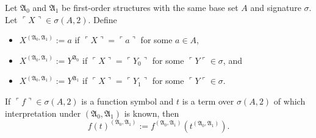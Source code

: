 \documentclass[12pt]{article}
\numberwithin{equation}{section}
\begin{document}
\begin{defi}
Let $\mathfrak{A}_0$ and $\mathfrak{A}_1$ be first-order structures with the same base set $A$ and signature $\sigma$. Let $\ulcorner X \urcorner \in \sigma(A, 2)$.
Define
\begin{itemize}
    \item $X^{(\mathfrak{A}_0, \mathfrak{A}_1)} := a$ if $\ulcorner X \urcorner = \ulcorner a \urcorner$ for some $a \in A$,
    \item $X^{(\mathfrak{A}_0, \mathfrak{A}_1)} := Y^{\mathfrak{A}_0}$ if $\ulcorner X \urcorner = \ulcorner Y_0 \urcorner$ for some $\ulcorner Y \ulcorner \in \sigma$, and
    \item $X^{(\mathfrak{A}_0, \mathfrak{A}_1)} := Y^{\mathfrak{A}_1}$ if $\ulcorner X \urcorner = \ulcorner Y_1 \urcorner$ for some $\ulcorner Y \ulcorner \in \sigma$.
\end{itemize}
If $\ulcorner f \urcorner \in \sigma(A, 2)$ is a function symbol and $t$ is a term over $\sigma(A, 2)$ of which interpretation under $(\mathfrak{A}_0, \mathfrak{A}_1)$ is known, then 
\begin{equation*}
    f(t)^{(\mathfrak{A}_0, \mathfrak{A}_1)} := f^{(\mathfrak{A}_0, \mathfrak{A}_1)}(t^{(\mathfrak{A}_0, \mathfrak{A}_1)}) \text{.}
\end{equation*}
\end{defi}
\end{document}
